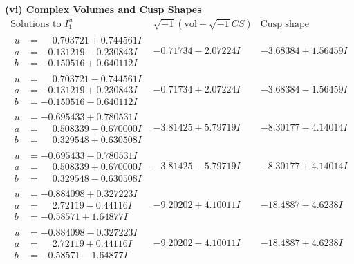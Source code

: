 \documentclass[1p]{elsarticle_modified}
\theoremstyle{definition}
\newcommand{\I}{\sqrt{-1}}
\begin{document}
\newpage\flushleft \textbf{(vi) Complex Volumes and Cusp Shapes}
$$\begin{array}{c|c|c}  
\text{Solutions to }I^u_{1}& \I (\text{vol} + \sqrt{-1}CS) & \text{Cusp shape}\\
 \hline 
\begin{aligned}
u &= \phantom{-}0.703721 + 0.744561 I \\
a &= -0.131219 - 0.230843 I \\
b &= -0.150516 + 0.640112 I\end{aligned}
 & -0.71734 - 2.07224 I & -3.68384 + 1.56459 I \\ \hline\begin{aligned}
u &= \phantom{-}0.703721 - 0.744561 I \\
a &= -0.131219 + 0.230843 I \\
b &= -0.150516 - 0.640112 I\end{aligned}
 & -0.71734 + 2.07224 I & -3.68384 - 1.56459 I \\ \hline\begin{aligned}
u &= -0.695433 + 0.780531 I \\
a &= \phantom{-}0.508339 - 0.670000 I \\
b &= \phantom{-}0.329548 + 0.630508 I\end{aligned}
 & -3.81425 + 5.79719 I & -8.30177 - 4.14014 I \\ \hline\begin{aligned}
u &= -0.695433 - 0.780531 I \\
a &= \phantom{-}0.508339 + 0.670000 I \\
b &= \phantom{-}0.329548 - 0.630508 I\end{aligned}
 & -3.81425 - 5.79719 I & -8.30177 + 4.14014 I \\ \hline\begin{aligned}
u &= -0.884098 + 0.327223 I \\
a &= \phantom{-}2.72119 - 0.44116 I \\
b &= -0.58571 + 1.64877 I\end{aligned}
 & -9.20202 + 4.10011 I & -18.4887 - 4.6238 I \\ \hline\begin{aligned}
u &= -0.884098 - 0.327223 I \\
a &= \phantom{-}2.72119 + 0.44116 I \\
b &= -0.58571 - 1.64877 I\end{aligned}
 & -9.20202 - 4.10011 I & -18.4887 + 4.6238 I \\ \hline\begin{aligned}

\end{aligned}
\end{array}$$
\end{document}

